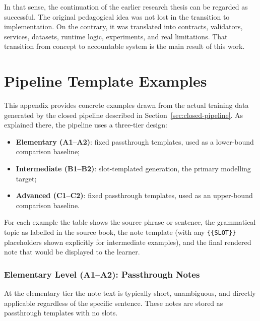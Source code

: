 \documentclass[12pt,a4paper,oneside]{report}
\begin{document}
In that sense, the continuation of the earlier research thesis can be regarded as successful. The original pedagogical idea was not lost in the transition to implementation. On the contrary, it was translated into contracts, validators, services, datasets, runtime logic, experiments, and real limitations. That transition from concept to accountable system is the main result of this work.

\appendix

\chapter{Pipeline Template Examples}
\label{app:pipeline-examples}
This appendix provides concrete examples drawn from the actual training data generated by the closed pipeline described in Section~\ref{sec:closed-pipeline}. As explained there, the pipeline uses a three-tier design:

\begin{itemize}
  \item \textbf{Elementary (A1--A2)}: fixed passthrough templates, used as a lower-bound comparison baseline;
  \item \textbf{Intermediate (B1--B2)}: slot-templated generation, the primary modelling target;
  \item \textbf{Advanced (C1--C2)}: fixed passthrough templates, used as an upper-bound comparison baseline.
\end{itemize}

For each example the table shows the source phrase or sentence, the grammatical topic as labelled in the source book, the note template (with any \texttt{\{\{SLOT\}\}} placeholders shown explicitly for intermediate examples), and the final rendered note that would be displayed to the learner.

\subsection*{Elementary Level (A1--A2): Passthrough Notes}

At the elementary tier the note text is typically short, unambiguous, and directly applicable regardless of the specific sentence. These notes are stored as passthrough templates with no slots.
\end{document}

